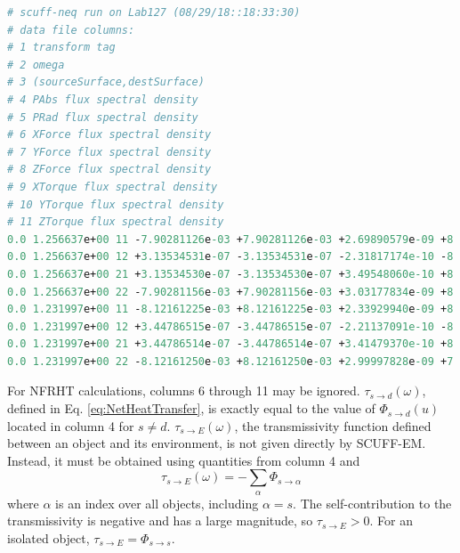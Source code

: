 \singlespacing
\begin{lstlisting}[language=Perl, caption=Sample output file from {\textsc{scuff-em}.}, label={lst:SCUFFExampleResults}]
# scuff-neq run on Lab127 (08/29/18::18:33:30)
# data file columns: 
# 1 transform tag
# 2 omega 
# 3 (sourceSurface,destSurface) 
# 4 PAbs flux spectral density
# 5 PRad flux spectral density
# 6 XForce flux spectral density
# 7 YForce flux spectral density
# 8 ZForce flux spectral density
# 9 XTorque flux spectral density
# 10 YTorque flux spectral density
# 11 ZTorque flux spectral density
0.0 1.256637e+00 11 -7.90281126e-03 +7.90281126e-03 +2.69890579e-09 +8.84873807e-09 +5.63661446e-06 +3.61864629e-07 -3.84970743e-07 +1.83454544e-07 
0.0 1.256637e+00 12 +3.13534531e-07 -3.13534531e-07 -2.31817174e-10 -8.73833724e-10 +3.15096081e-06 +7.15556954e-09 -1.58668386e-07 +3.72063847e-09 
0.0 1.256637e+00 21 +3.13534530e-07 -3.13534530e-07 +3.49548060e-10 +8.71691790e-10 -3.15110593e-06 -8.50545313e-09 -1.70369659e-08 +1.50823996e-09 
0.0 1.256637e+00 22 -7.90281156e-03 +7.90281156e-03 +3.03177834e-09 +8.33691980e-09 -5.65780382e-06 -8.43395835e-05 +3.44041141e-05 +1.84850281e-07 
0.0 1.231997e+00 11 -8.12161225e-03 +8.12161225e-03 +2.33929940e-09 +8.21665833e-09 -1.23062421e-06 +3.92032030e-07 -4.11282818e-07 +1.79000346e-07 
0.0 1.231997e+00 12 +3.44786515e-07 -3.44786515e-07 -2.21137091e-10 -8.30112384e-10 +2.79435617e-06 +4.43090059e-09 -1.52735690e-07 +3.57295128e-09 
0.0 1.231997e+00 21 +3.44786514e-07 -3.44786514e-07 +3.41479370e-10 +8.37460786e-10 -2.79450235e-06 +4.12857975e-09 -2.13249109e-08 -6.37395124e-10 
0.0 1.231997e+00 22 -8.12161250e-03 +8.12161250e-03 +2.99997828e-09 +7.74714497e-09 +1.21073213e-06 -8.33215031e-05 +3.39882913e-05 +1.82055594e-07
\end{lstlisting}
\doublespacing
%

For NFRHT calculations, columns 6 through 11 may be ignored. $\tau_{s \rightarrow d}(\omega)$, defined in Eq. \ref{eq:NetHeatTransfer}, is exactly equal to the value of $\Phi_{s \rightarrow d}(u)$ located in column 4 for $s \ne d$. $\tau_{s \rightarrow E}(\omega)$, the transmissivity function defined between an object and its environment, is not given directly by \textsc{SCUFF-EM}. Instead, it must be obtained using quantities from column 4 and 
\begin{equation}
\tau_{s \rightarrow E}(\omega) = -\sum_{\alpha} \Phi_{s \rightarrow \alpha}
\end{equation}
%
where $\alpha$ is an index over all objects, including $\alpha=s$. The self-contribution to the transmissivity is negative and has a large magnitude, so $\tau_{s \rightarrow E} > 0$. For an isolated object, $\tau_{s \rightarrow E} = \Phi_{s \rightarrow s}$.